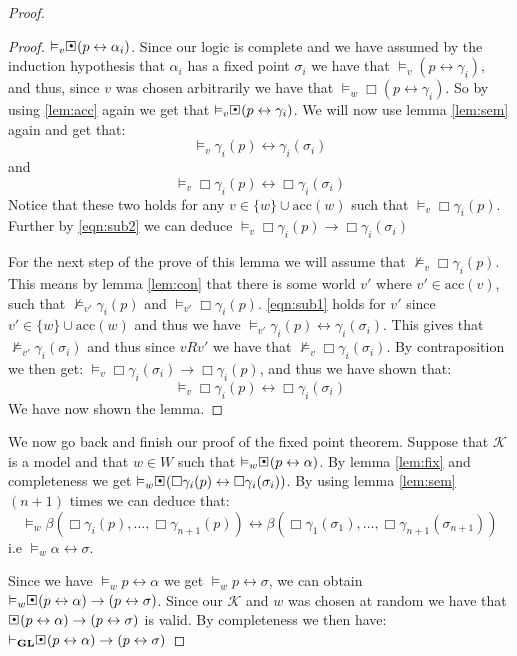 \documentclass[../main.tex]{subfiles}
\begin{document}
\begin{proof}
\begin{proof}
		$\vDash_v\sBox(p\leftrightarrow\alpha_i)$. Since our logic is
		complete and we have assumed by the induction hypothesis that
		$\alpha_i$ has a fixed point $\sigma_i$ we have that
		$\vDash_v(p\leftrightarrow\gamma_i)$, and thus, since $v$ was
		chosen arbitrarily we have that
		$\vDash_w\Box(p\leftrightarrow\gamma_i)$. So by using
		\ref{lem:acc} again we get that
		$\vDash_v\sBox(p\leftrightarrow\gamma_i)$. We will now use
		lemma \ref{lem:sem} again and get that:
		\begin{equation}
			\label{eqn:sub1}
			\vDash_v\gamma_i(p)\leftrightarrow\gamma_i(\sigma_i)
		\end{equation}
		and
		\begin{equation}
			\label{eqn:sub2}
			\vDash_v\Box\gamma_i(p)\leftrightarrow\Box\gamma_i(\sigma_i)
		\end{equation}
		Notice that these two holds for any $v\in\{w\}\cup\text{acc}(w)$ such that
		$\vDash_v\Box\gamma_i(p)$.
		Further by \ref{eqn:sub2} we can deduce
		$\vDash_v\Box\gamma_i(p)\rightarrow\Box\gamma_i(\sigma_i)$

		For the next step of the prove of this lemma we will assume that
		$\not\vDash_v\Box\gamma_i(p)$. This means by lemma
		\ref{lem:con} that there is some world $v'$ where
		$v'\in\text{acc}(v)$, such that $\not\vDash_{v'}\gamma_i(p)$
		and $\vDash_{v'}\Box\gamma_i(p)$. \ref{eqn:sub1} holds for $v'$
		since $v'\in\{w\}\cup\text{acc}(w)$ and thus we have
		$\vDash_{v'}\gamma_i(p)\leftrightarrow\gamma_i(\sigma_i)$. This
		gives that $\not\vDash_{v'}\gamma_i(\sigma_i)$ and thus since
		$vRv'$ we have that $\not\vDash_v\Box\gamma_i(\sigma_i)$. By
		contraposition we then get:
		$\vDash_v\Box\gamma_i(\sigma_i)\rightarrow\Box\gamma_i(p)$, and
		thus we have shown that:
		$$\vDash_v\Box\gamma_i(p)\leftrightarrow\Box\gamma_i(\sigma_i)$$
		We have now shown the lemma.
	\end{proof}
	We now go back and finish our proof of the fixed point theorem. Suppose
	that $\mathcal{K}$ is a model and that $w\in W$ such that
	$\vDash_w\sBox(p\leftrightarrow\alpha)$. By lemma \ref{lem:fix} and
	completeness we get
	$\vDash_w\sBox(\Box\gamma_i(p)\leftrightarrow\Box\gamma_i(\sigma_i))$.
	By using lemma \ref{lem:sem} $(n+1)$ times we can deduce that:
	$$\vDash_w\beta(\Box\gamma_i(p),\ldots,\Box\gamma_{n+1}(p))\leftrightarrow\beta(
	\Box\gamma_1(\sigma_1),\ldots,\Box\gamma_{n+1}(\sigma_{n+1}))$$
	i.e $\vDash_w\alpha\leftrightarrow\sigma$. 

	Since we have $\vDash_w p\leftrightarrow\alpha$ we get $\vDash_w
	p\leftrightarrow\sigma$, we can obtain
	$\vDash_w\sBox(p\leftrightarrow\alpha)\rightarrow(p\leftrightarrow\sigma)$.
	Since our $\mathcal{K}$ and $w$ was chosen at random we have that
	$\sBox(p\leftrightarrow\alpha)\rightarrow(p\leftrightarrow\sigma)$ is
	valid. By completeness we then have:
	$\vdash_\GL\sBox(p\leftrightarrow\alpha)\rightarrow(p\leftrightarrow
	\sigma)$
\end{proof}
\end{document}
